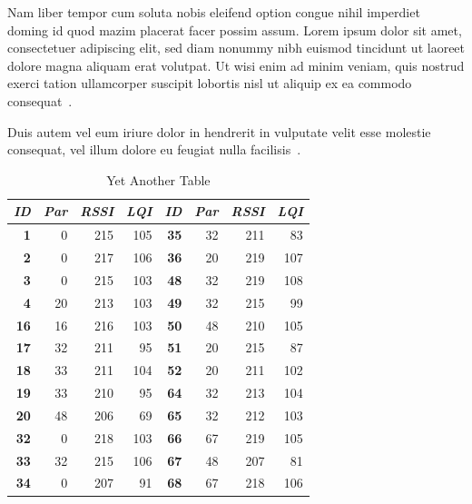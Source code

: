 Nam liber tempor cum soluta nobis eleifend option congue nihil imperdiet doming
id quod mazim placerat facer possim assum. Lorem ipsum dolor sit amet,
consectetuer adipiscing elit, sed diam nonummy nibh euismod tincidunt ut laoreet
dolore magna aliquam erat volutpat. Ut wisi enim ad minim veniam, quis nostrud
exerci tation ullamcorper suscipit lobortis nisl ut aliquip ex ea commodo
consequat~\cite{lori:snfer}.

Duis autem vel eum iriure dolor in hendrerit in vulputate velit esse molestie
consequat, vel illum dolore eu feugiat nulla facilisis~\cite{main:wsnfh}.

\begin{table}
\begin{center}
\begin{tabular}{|r|r|r|r||r|r|r|r|}
\hline \textbf{\textit{ID}} & \textbf{\textit{Par}} & \textbf{\textit{RSSI}} &
\textbf{\textit{LQI}} &
\textbf{\textit{ID}} & \textbf{\textit{Par}} & \textbf{\textit{RSSI}} & \textbf{\textit{LQI}} \\
\hline \hline
\textbf{1}  &  0 & 215 & 105 & \textbf{35} & 32 & 211 &  83 \\
\textbf{2}  &  0 & 217 & 106 & \textbf{36} & 20 & 219 & 107 \\
\textbf{3}  &  0 & 215 & 103 & \textbf{48} & 32 & 219 & 108 \\
\textbf{4}  & 20 & 213 & 103 & \textbf{49} & 32 & 215 &  99 \\
\textbf{16} & 16 & 216 & 103 & \textbf{50} & 48 & 210 & 105 \\
\textbf{17} & 32 & 211 &  95 & \textbf{51} & 20 & 215 &  87 \\
\textbf{18} & 33 & 211 & 104 & \textbf{52} & 20 & 211 & 102 \\
\textbf{19} & 33 & 210 &  95 & \textbf{64} & 32 & 213 & 104 \\
\textbf{20} & 48 & 206 &  69 & \textbf{65} & 32 & 212 & 103 \\
\textbf{32} &  0 & 218 & 103 & \textbf{66} & 67 & 219 & 105 \\
\textbf{33} & 32 & 215 & 106 & \textbf{67} & 48 & 207 &  81 \\
\textbf{34} &  0 & 207 &  91 & \textbf{68} & 67 & 218 & 106 \\
\hline
\end{tabular}
\caption{Yet Another Table}
\end{center}
\end{table}

